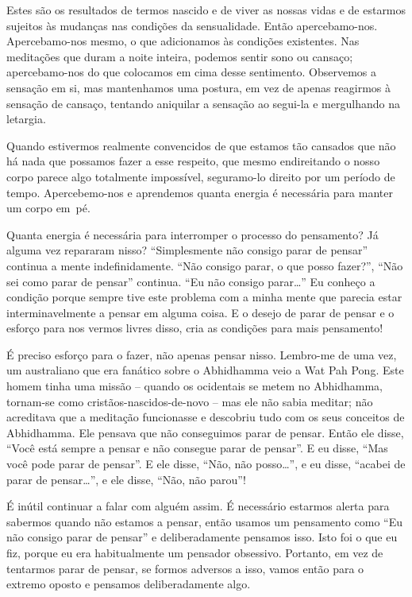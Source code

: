 Estes são os resultados de termos nascido e de viver as nossas vidas e de
estarmos sujeitos às mudanças nas condições da sensualidade. Então
apercebamo-nos. Apercebamo-nos mesmo, o que adicionamos às condições existentes.
Nas meditações que duram a noite inteira, podemos sentir sono ou cansaço;
apercebamo-nos do que colocamos em cima desse sentimento. Observemos a sensação
em si, mas mantenhamos uma postura, em vez de apenas reagirmos à sensação de
cansaço, tentando aniquilar a sensação ao segui-la e mergulhando na letargia.

Quando estivermos realmente convencidos de que estamos tão cansados que não há
nada que possamos fazer a esse respeito, que mesmo endireitando o nosso corpo
parece algo totalmente impossível, seguramo-lo direito por um período de tempo.
Apercebemo-nos e aprendemos quanta energia é necessária para manter um corpo
em~pé.

Quanta energia é necessária para interromper o processo do pensamento? Já alguma
vez repararam nisso? ``Simplesmente não consigo parar de pensar'' continua a
mente indefinidamente. ``Não consigo parar, o que posso fazer?'', ``Não sei como
parar de pensar'' continua. ``Eu não consigo parar\ldots{}'' Eu conheço a
condição porque sempre tive este problema com a minha mente que parecia estar
interminavelmente a pensar em alguma coisa. E o desejo de parar de pensar e o
esforço para nos vermos livres disso, cria as condições para mais pensamento!

É preciso esforço para o fazer, não apenas pensar nisso. Lembro-me de uma vez,
um australiano que era fanático sobre o Abhidhamma veio a Wat Pah Pong. Este
homem tinha uma missão -- quando os ocidentais se metem no Abhidhamma, tornam-se
como cristãos-nascidos-de-novo -- mas ele não sabia meditar; não acreditava que
a meditação funcionasse e descobriu tudo com os seus conceitos de Abhidhamma.
Ele pensava que não conseguimos parar de pensar. Então ele disse, ``Você está
sempre a pensar e não consegue parar de pensar''. E eu disse, ``Mas você pode
parar de pensar''. E ele disse, ``Não, não posso\ldots{}'', e eu disse,
``acabei de parar de pensar\ldots{}'', e ele disse, ``Não, não parou''!

É inútil continuar a falar com alguém assim. É necessário estarmos alerta para
sabermos quando não estamos a pensar, então usamos um pensamento como ``Eu não
consigo parar de pensar'' e deliberadamente pensamos isso. Isto foi o que eu
fiz, porque eu era habitualmente um pensador obsessivo. Portanto, em vez de
tentarmos parar de pensar, se formos adversos a isso, vamos então para o extremo
oposto e pensamos deliberadamente algo.

